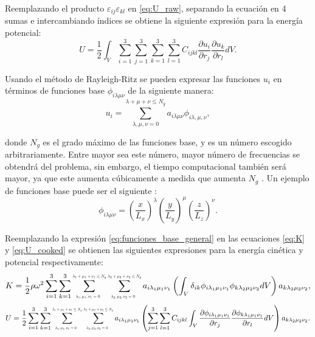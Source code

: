 \documentclass[12pt]{article}
\newcommand*{\Scale}[2][4]{\scalebox{#1}{$#2$}}%
\begin{document}
Reemplazando el producto $\varepsilon_{ij}\varepsilon_{kl}$ en \ref{eq:U_raw}, separando la ecuación en 4 sumas e intercambiando índices se obtiene la siguiente expresión para la energía potencial:
\begin{equation}
	U = \frac{1}{2} \int_{V}{\sum_{i=1}^{3}\sum_{j=1}^{3}\sum_{k=1}^{3}\sum_{l=1}^{3}{C_{ijkl}\frac{\partial u_i}{\partial r_j} \frac{\partial u_k}{\partial r_l}}dV}.
	\label{eq:U_cooked}
\end{equation}

Usando el método de Rayleigh-Ritz se pueden expresar las funciones $u_i$ en términos de funciones base $\phi_{i \lambda \mu \nu}$ de la siguiente manera: 
\begin{equation}
	u_i = \sum_{\lambda,\mu,\nu=0}^{\lambda + \mu + \nu \le N_g}{a_{i\lambda\mu\nu} \phi_{i\lambda,\mu,\nu}},
	\label{eq:funciones_base_general}
\end{equation}

donde $N_g$ es el grado máximo de las funciones base, y es un número escogido arbitrariamente. Entre mayor sea este número, mayor número de frecuencias se obtendrá del problema, sin embargo, el tiempo computacional también será mayor, ya que este aumenta cúbicamente a medida que aumenta $N_g$ \cite{Leisure_1997}. Un ejemplo de funciones base puede ser el siguiente \cite{Demarest}:
\begin{equation}
    \phi_{i \lambda \mu \nu} = \left(\frac{x}{L_x} \right)^{\lambda} \left(\frac{y}{L_y} \right)^{\mu} \left(\frac{z}{L_z} \right)^{\nu}.
	\label{eq:funciones_base_potencias}
\end{equation}

Reemplazando la expresión \ref{eq:funciones_base_general} en las ecuaciones \ref{eq:K} y \ref{eq:U_cooked} se obtienen las siguientes expresiones para la energía cinética y potencial respectivamente:
\begin{equation}
	K = \frac{1}{2} \rho \omega^2 \sum_{i=1}^{3}\sum_{k=1}^{3}\sum_{\Scale[0.5]{\lambda_1,\mu_1,\nu_1 = 0}}^{\Scale[0.5]{\lambda_1 + \mu_1 + \nu_1 \le N_g}} \sum_{\Scale[0.5]{\lambda_2,\mu_2,\nu_2 = 0}}^{\Scale[0.5]{\lambda_2 + \mu_2 + \nu_2 \le N_g}} {a_{i \lambda_1 \mu_1 \nu_1} \left(\int_{V} {\delta_{ik} \phi_{i \lambda_1 \mu_1 \nu_1} \phi_{k \lambda_2 \mu_2 \nu_2} dV} \right) a_{k \lambda_2 \mu_2 \nu_2}},
	\label{eq:K_final}
\end{equation}
\begin{equation}
	\centering
	U = \frac{1}{2} \sum_{i=1}^{3}\sum_{k=1}^{3}\sum_{\Scale[0.5]{\lambda_1,\mu_1,\nu_1 = 0}}^{\Scale[0.5]{\lambda_1 + \mu_1 + \nu_1 \le N_g}} \sum_{\Scale[0.5]{\lambda_2,\mu_2,\nu_2 = 0}}^{\Scale[0.5]{\lambda_2 + \mu_2 + \nu_2 \le N_g}} {a_{i \lambda_1 \mu_1 \nu_1}\left(\sum_{j=1}^{3}\sum_{l=1}^{3} C_{ijkl}\int_{V} { \frac{\partial \phi_{i \lambda_1 \mu_1 \nu_1}}{\partial r_j} \frac{\partial \phi_{k \lambda_1 \mu_1 \nu_1}}{\partial r_l} dV} \right) a_{k \lambda_2 \mu_2 \nu_2}}.
	\label{eq:U_final}
\end{equation}
\end{document}
